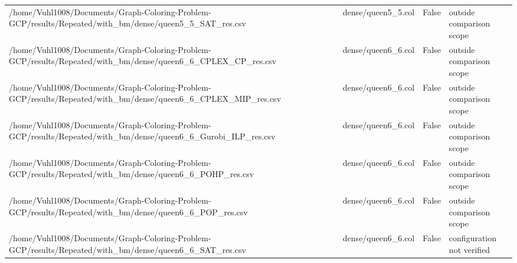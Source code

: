 \begin{table}[htbp]
\begin{tabular}{llll}
/home/Vuhl1008/Documents/Graph-Coloring-Problem-GCP/results/Repeated/with\_bm/dense/queen5\_5\_SAT\_res.csv & dense/queen5\_5.col & False & outside comparison scope \\
/home/Vuhl1008/Documents/Graph-Coloring-Problem-GCP/results/Repeated/with\_bm/dense/queen6\_6\_CPLEX\_CP\_res.csv & dense/queen6\_6.col & False & outside comparison scope \\
/home/Vuhl1008/Documents/Graph-Coloring-Problem-GCP/results/Repeated/with\_bm/dense/queen6\_6\_CPLEX\_MIP\_res.csv & dense/queen6\_6.col & False & outside comparison scope \\
/home/Vuhl1008/Documents/Graph-Coloring-Problem-GCP/results/Repeated/with\_bm/dense/queen6\_6\_Gurobi\_ILP\_res.csv & dense/queen6\_6.col & False & outside comparison scope \\
/home/Vuhl1008/Documents/Graph-Coloring-Problem-GCP/results/Repeated/with\_bm/dense/queen6\_6\_POHP\_res.csv & dense/queen6\_6.col & False & outside comparison scope \\
/home/Vuhl1008/Documents/Graph-Coloring-Problem-GCP/results/Repeated/with\_bm/dense/queen6\_6\_POP\_res.csv & dense/queen6\_6.col & False & outside comparison scope \\
/home/Vuhl1008/Documents/Graph-Coloring-Problem-GCP/results/Repeated/with\_bm/dense/queen6\_6\_SAT\_res.csv & dense/queen6\_6.col & False & configuration not verified \\
\hline
\end{tabular}
\end{table}
